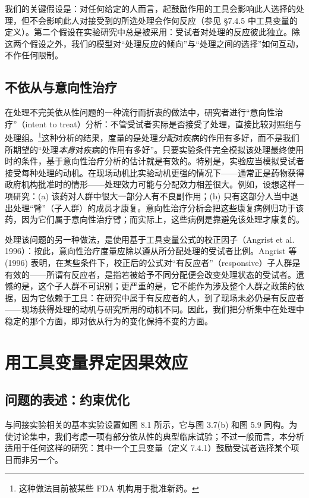 我们的关键假设是：对任何给定的人而言，起鼓励作用的工具会影响此人选择的处理，但不会影响此人对接受到的所选处理会作何反应（参见 \S 7.4.5 中工具变量的定义）。第二个假设在实验研究中总是被采用：受试者对处理的反应彼此独立。除这两个假设之外，我们的模型对“处理反应的倾向”与“处理之间的选择”如何互动，不作任何限制。

\subsection{不依从与意向性治疗}

在处理不完美依从性问题的一种流行而折衷的做法中，研究者进行“意向性治疗”（intent to treat）分析：不管受试者实际是否接受了处理，直接比较对照组与处理组。\footnote{这种做法目前被某些 FDA 机构用于批准新药。}这种分析的结果，度量的是处理\emph{分配}对疾病的作用有多好，而不是我们所期望的“处理\emph{本身}对疾病的作用有多好”。只要实验条件完全模拟该处理最终使用时的条件，基于意向性治疗分析的估计就是有效的。特别是，实验应当模拟受试者接受每种处理的动机。在现场动机比实验动机更强的情况下——通常正是药物获得政府机构批准时的情形——处理效力可能与分配效力相差很大。例如，设想这样一项研究：(a) 该药对人群中很大一部分人有不良副作用；(b) 只有这部分人当中退出处理“臂”（子人群）的成员才康复。意向性治疗分析会把这些康复病例归功于该药，因为它们属于意向性治疗臂；而实际上，这些病例是靠避免该处理才康复的。

处理该问题的另一种做法，是使用基于工具变量公式的校正因子（Angrist et al. 1996）：按此，意向性治疗度量应除以遵从所分配处理的受试者比例。Angrist 等 (1996) 表明，在某些条件下，校正后的公式对“有反应者”（responsive）子人群是有效的——所谓有反应者，是指若被给予不同分配便会改变处理状态的受试者。遗憾的是，这个子人群不可识别；更严重的是，它不能作为涉及整个人群之政策的依据，因为它依赖于工具：在研究中属于有反应者的人，到了现场未必仍是有反应者——现场获得处理的动机与研究所用的动机不同。因此，我们把分析集中在处理中稳定的那个方面，即对依从行为的变化保持不变的方面。

\section{用工具变量界定因果效应}

\subsection{问题的表述：约束优化}

与间接实验相关的基本实验设置如图 8.1 所示，它与图 3.7(b) 和图 5.9 同构。为使讨论集中，我们考虑一项有部分依从性的典型临床试验；不过一般而言，本分析适用于任何这样的研究：其中一个工具变量（定义 7.4.1）鼓励受试者选择某个项目而非另一个。

